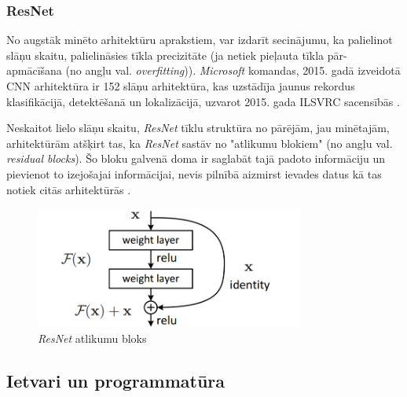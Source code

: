 \subsubsection{ResNet}
No augstāk minēto arhitektūru aprakstiem, var izdarīt secinājumu, ka palielinot slāņu skaitu, palielināsies tīkla precizitāte (ja netiek pieļauta tīkla pār-apmācīšana (no angļu val. \textit{overfitting})). \textit{Microsoft} komandas, 2015. gadā izveidotā CNN arhitektūra ir 152 slāņu arhitektūra, kas uzstādīja jaunus rekordus klasifikācijā, detektēšanā un lokalizācijā, uzvarot 2015. gada ILSVRC sacensībās \cite{ILSVRC15}. 

Neskaitot lielo slāņu skaitu,    \textit{ResNet} tīklu struktūra no pārējām, jau minētajām, arhitektūrām atšķirt tas, ka \textit{ResNet} sastāv no "atlikumu blokiem" (no angļu val. \textit{residual blocks}). Šo bloku galvenā doma ir saglabāt tajā padoto informāciju un pievienot to izejošajai informācijai, nevis pilnībā aizmirst ievades datus kā tas notiek citās arhitektūrās \cite{he2016deep}. 

\begin{figure}[h]%
	\centering
	\includegraphics[height=4cm]{images/resnet.png} %
	\caption{\textit{ResNet} atlikumu bloks \cite{he2016deep}}%
	\label{fig:example}%
\end{figure}
\subsection{Ietvari un programmatūra}

